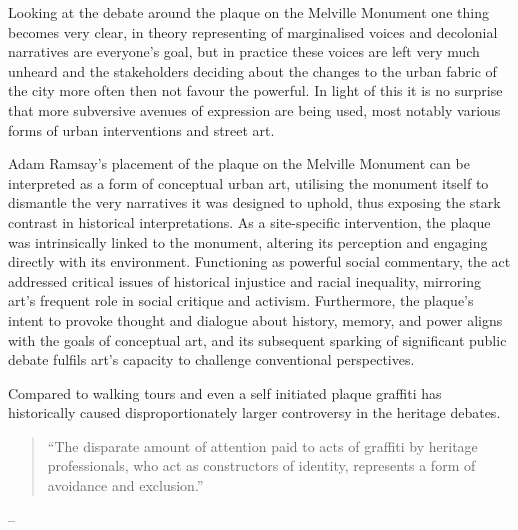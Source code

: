 \documentclass{scrartcl}
\renewcommand{\cite}{\parencite}
\begin{document}
Looking at the debate around the plaque on the Melville Monument one thing becomes very clear, in theory representing of marginalised voices and decolonial narratives are everyone's goal, but in practice these voices are left very much unheard and the stakeholders deciding about the changes to the urban fabric of the city more often then not favour the powerful. 
In light of this it is no surprise that more subversive avenues of expression are being used, most notably various forms of urban interventions and street art.

Adam Ramsay's placement of the plaque on the Melville Monument can be interpreted as a form of conceptual urban art, utilising the monument itself to dismantle the very narratives it was designed to uphold, thus exposing the stark contrast in historical interpretations. As a site-specific intervention, the plaque was intrinsically linked to the monument, altering its perception and engaging directly with its environment. Functioning as powerful social commentary, the act addressed critical issues of historical injustice and racial inequality, mirroring art's frequent role in social critique and activism. Furthermore, the plaque's intent to provoke thought and dialogue about history, memory, and power aligns with the goals of conceptual art, and its subsequent sparking of significant public debate fulfils art's capacity to challenge conventional perspectives.

Compared to walking tours and even a self initiated plaque graffiti has historically caused disproportionately larger controversy in the heritage debates. 

\begin{quotation}
``The disparate amount of attention paid to acts of graffiti by heritage professionals, who act as constructors of identity, represents a form of avoidance and exclusion.''
\end{quotation}
\begin{flushright}
-- \cite{merrill_2011}
\end{flushright}
\end{document}
